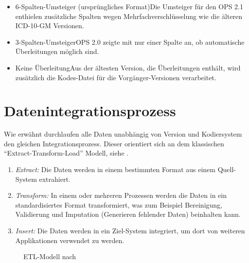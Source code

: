 \begin{itemize}
\item 6-Spalten-Umsteiger (ursprüngliches Format)\newline Die Umsteiger für den OPS 2.1 enthielen zusätzliche Spalten wegen Mehrfachverschlüsselung wie die älteren ICD-10-GM Versionen. 
\item 3-Spalten-Umsteiger\newline OPS 2.0 zeigte mit nur einer Spalte an, ob automatische Überleitungen möglich sind. 
\item Keine Überleitung\newline Aus der ältesten Version, die Überleitungen enthält, wird zusätzlich die Kodes-Datei für die Vorgänger-Versionen verarbeitet.
\end{itemize}

\section{Datenintegrationsprozess}

Wie erwähnt durchlaufen alle Daten unabhängig von Version und Kodiersystem den gleichen Integrationsprozess. Dieser orientiert sich an dem klassischen "`Extract-Transform-Load"' Modell, siehe \cite[Seite 247ff]{bonnefoy2024definitive}.

\begin{enumerate}
\item \emph{Extract:} Die Daten werden in einem bestimmten Format aus einem Quell-System extrahiert. 
\item \emph{Transform:} In einem oder mehreren Prozessen werden die Daten in ein standardisiertes Format transformiert, was zum Beispiel Bereinigung, Validierung und Imputation (Generieren fehlender Daten) beinhalten kann.
\item \emph{Insert:} Die Daten werden in ein Ziel-System integriert, um dort von weiteren Applikationen verwendet zu werden. 
\end{enumerate}


\begin{figure}[H]
    \centering
    \setlength{\fboxsep}{.02\linewidth}\color{black!20}
    \vspace{-10pt}
    \normalcolor\caption{ETL-Modell nach \cite[Seite 63]{bonnefoy2024definitive}}
\end{figure}

